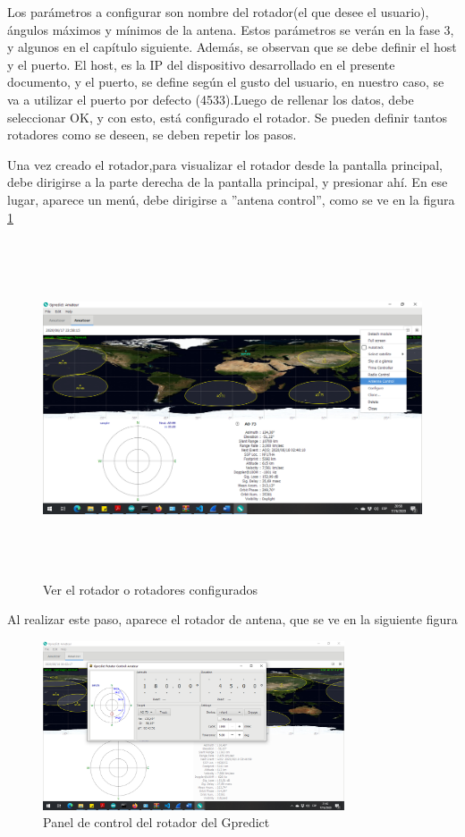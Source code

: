 Los parámetros a configurar son nombre del rotador(el que desee el usuario), ángulos máximos y mínimos de la antena. Estos parámetros se verán en la fase 3, y algunos en el capítulo siguiente. Además, se observan que se debe definir el host y el puerto. El host, es la IP del dispositivo desarrollado en el presente documento, y el puerto, se define según el gusto del usuario, en nuestro caso, se va a utilizar el puerto por defecto (4533).Luego de rellenar los datos, debe seleccionar OK, y con esto, está configurado el rotador. Se pueden definir tantos rotadores como se deseen, se deben repetir los pasos. 

Una vez creado el rotador,para visualizar el rotador desde la pantalla principal, debe dirigirse a la parte derecha de la pantalla principal, y presionar ahí. En ese lugar, aparece un menú, debe dirigirse a ''antena control'', como se ve en la figura \ref{fig:ant_ctrl} 
\begin{figure}[H]
	\includegraphics[height=10cm,width=\linewidth]{antena_control}
	\caption{Ver el rotador o rotadores configurados} 
	\label{fig:ant_ctrl}
\end{figure}



Al realizar este paso, aparece el rotador de antena, que se ve en la siguiente figura 

\begin{figure}[H]
	\centering 
	\includegraphics[trim=5.4cm 8cm 9.2cm 2.4cm ,clip,width=\linewidth,height=5cm]{antena_gpr_control}
	\caption{Panel de control del rotador del Gpredict} 
	\label{fig:pan_ctrl_antena}
\end{figure}

